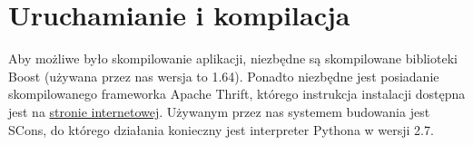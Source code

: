 \chapter{Uruchamianie i kompilacja}
Aby możliwe było skompilowanie aplikacji, niezbędne są skompilowane biblioteki Boost (używana przez nas wersja to 1.64). Ponadto niezbędne jest posiadanie skompilowanego frameworka Apache Thrift, którego instrukcja instalacji dostępna jest na \href{https://thrift.apache.org/}{stronie internetowej}. Używanym przez nas systemem budowania jest SCons, do którego działania konieczny jest interpreter Pythona w wersji 2.7.